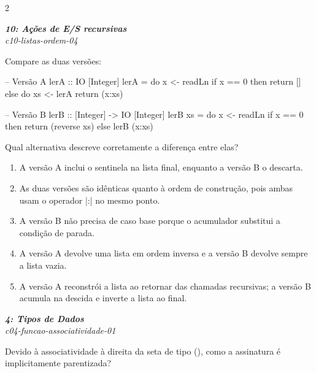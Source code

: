 \documentclass[a4paper,10pt,brazil]{article}
\begin{document}
\begin{multicols}{2}
\begin{enumerate}
\end{enumerate}

\begin{flushright}
  \footnotesize
  \textit{\textbf{10: Ações de E/S recursivas}}\\
  \textit{c10-listas-ordem-04}\\

\end{flushright}
Compare as duas versões:

\begin{haskellcode}
-- Versão A
lerA :: IO [Integer]
lerA = do
  x <- readLn
  if x == 0
    then return []
    else do
      xs <- lerA
      return (x:xs)

-- Versão B
lerB :: [Integer] -> IO [Integer]
lerB xs = do
  x <- readLn
  if x == 0
    then return (reverse xs)
    else lerB (x:xs)
\end{haskellcode}

Qual alternativa descreve corretamente a diferença entre elas?

\begin{enumerate}
  \item A versão A inclui o sentinela na lista final, enquanto a versão B o descarta.

  \item As duas versões são idênticas quanto à ordem de construção, pois ambas usam o operador \haskellinline|:| no mesmo ponto.

  \item A versão B não precisa de caso base porque o acumulador substitui a condição de parada.

  \item A versão A devolve uma lista em ordem inversa e a versão B devolve sempre a lista vazia.

  \item A versão A reconstrói a lista ao retornar das chamadas recursivas; a versão B acumula na descida e inverte a lista ao final.


\end{enumerate}

\begin{flushright}
  \footnotesize
  \textit{\textbf{4: Tipos de Dados}}\\
  \textit{c04-funcao-associatividade-01}\\

\end{flushright}
Devido à associatividade à direita da seta de tipo (\haskellinline{->}), como a assinatura  é implicitamente parentizada?


\end{multicols}
\end{document}
